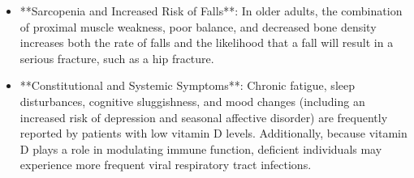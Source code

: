 \begin{itemize}
    \item **Sarcopenia and Increased Risk of Falls**: In older adults, the combination of proximal muscle weakness, poor balance, and decreased bone density increases both the rate of falls and the likelihood that a fall will result in a serious fracture, such as a hip fracture.
    \item **Constitutional and Systemic Symptoms**: Chronic fatigue, sleep disturbances, cognitive sluggishness, and mood changes (including an increased risk of depression and seasonal affective disorder) are frequently reported by patients with low vitamin D levels. Additionally, because vitamin D plays a role in modulating immune function, deficient individuals may experience more frequent viral respiratory tract infections.
\end{itemize}

